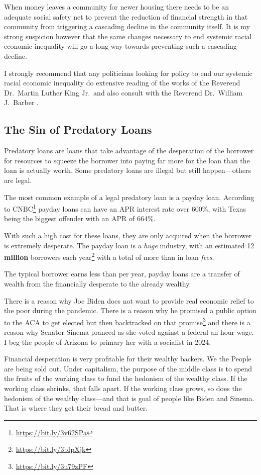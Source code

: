 When money leaves a community for newer housing there needs to be an adequate social safety net to prevent the reduction of financial strength in that community from triggering a cascading decline in the community itself. It is my strong suspicion however that the same changes necessary to end systemic racial economic inequality will go a long way towards preventing such a cascading decline.

I strongly recommend that any politicians looking for policy to end our systemic racial economic inequality do extensive reading of the works of the Reverend Dr.\ Martin Luther King Jr.\ and also consult with the Reverend Dr.\ William J.\ Barber .

\subsection{The Sin of Predatory Loans}

Predatory loans are loans that take advantage of the desperation of the borrower for resources to squeeze the borrower into paying far more for the loan than the loan is actually worth. Some predatory loans are illegal but still happen---others are legal.

The most common example of a legal predatory loan is a payday loan. According to CNBC\footnote{\url{https://bit.ly/3v62SPa}} payday loans can have an APR interest rate over 600\%, with Texas being the biggest offender with an APR of 664\%.

With such a high cost for these loans, they are only acquired when the borrower is extremely desperate. The payday loan is a \emph{huge} industry, with an estimated 12 \textbf{million} borrowers each year\footnote{\label{lendedu}\url{https://bit.ly/3bIpXjk}} with a total of more than  in loan \emph{fees}.

The typical borrower earns less than  per year, payday loans are a transfer of wealth from the financially desperate to the already wealthy.

There is a reason why Joe Biden does not want to provide real economic relief to the poor during the pandemic. There is a reason why he promised a public option to the ACA to get elected but then backtracked on that promise\footnote{\url{https://bit.ly/3u79zPF}} and there is a reason why Senator Sinema pranced as she voted against a federal  an hour wage. I beg the people of Arizona to primary her with a socialist in 2024.

Financial desperation is very profitable for their wealthy backers. We the People are being sold out. Under capitalism, the purpose of the middle class is to spend the fruits of the working class to fund the hedonism of the wealthy class. If the working class shrinks, that falls apart. If the working class grows, so does the hedonism of the wealthy class---and that is goal of people like Biden and Sinema. That is where they get their bread and butter.

